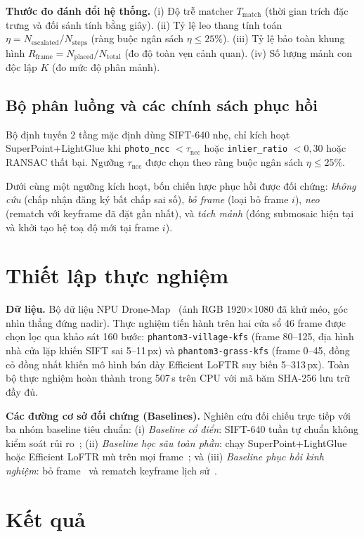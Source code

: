 \documentclass[conference]{IEEEtran}
\begin{document}
\textbf{Thước đo đánh đổi hệ thống.} (i) Độ trễ matcher $T_{\mathrm{match}}$ (thời gian trích
đặc trưng và đối sánh tính bằng giây). (ii) Tỷ lệ leo thang tính toán
$\eta = N_{\mathrm{escalated}} / N_{\mathrm{steps}}$ (ràng buộc ngân sách $\eta \le 25\%$).
(iii) Tỷ lệ bảo toàn khung hình $R_{\mathrm{frame}} = N_{\mathrm{placed}} / N_{\mathrm{total}}$
(đo độ toàn vẹn cảnh quan). (iv) Số lượng mảnh con độc lập $K$ (đo mức độ phân mảnh).

\subsection{Bộ phân luồng và các chính sách phục hồi}
Bộ định tuyến 2 tầng mặc định dùng SIFT-640 nhẹ, chỉ kích hoạt SuperPoint+LightGlue
khi \texttt{photo\_ncc} $< \tau_{\mathrm{ncc}}$ hoặc \texttt{inlier\_ratio} $< 0{,}30$
hoặc RANSAC thất bại. Ngưỡng $\tau_{\mathrm{ncc}}$ được chọn theo ràng buộc ngân sách $\eta \le 25\%$.

Dưới cùng một ngưỡng kích hoạt, bốn chiến lược phục hồi được đối chứng: \emph{không cứu}
(chấp nhận đăng ký bất chấp sai số), \emph{bỏ frame} (loại bỏ frame $i$), \emph{neo}
(rematch với keyframe đã đặt gần nhất), và \emph{tách mảnh} (đóng submosaic hiện tại và
khởi tạo hệ toạ độ mới tại frame $i$).

\section{Thiết lập thực nghiệm}
\textbf{Dữ liệu.} Bộ dữ liệu NPU Drone-Map~\cite{map2dfusion} (ảnh RGB 1920$\times$1080 đã khử méo,
góc nhìn thẳng đứng nadir). Thực nghiệm tiến hành trên hai cửa sổ 46 frame được chọn lọc
qua khảo sát 160 bước: \texttt{phantom3-village-kfs} (frame 80--125, địa hình nhà cửa lặp khiến
SIFT sai 5--11\,px) và \texttt{phantom3-grass-kfs} (frame 0--45, đồng cỏ đồng nhất khiến mô
hình bán dày Efficient LoFTR suy biến 5--313\,px). Toàn bộ thực nghiệm hoàn thành trong 507\,s
trên CPU với mã băm SHA-256 lưu trữ đầy đủ.

\textbf{Các đường cơ sở đối chứng (Baselines).} Nghiên cứu đối chiếu trực tiếp với ba nhóm
baseline tiêu chuẩn: (i) \emph{Baseline cổ điển}: SIFT-640 tuần tự chuẩn không kiểm soát rủi
ro~\cite{hwang2026,map2dfusion}; (ii) \emph{Baseline học sâu toàn phần}: chạy SuperPoint+LightGlue
hoặc Efficient LoFTR mù trên mọi frame~\cite{kim2025,wang2024}; và (iii) \emph{Baseline phục
hồi kinh nghiệm}: bỏ frame~\cite{hwang2026} và rematch keyframe lịch sử~\cite{li2023}.
\section{Kết quả}
\end{document}
